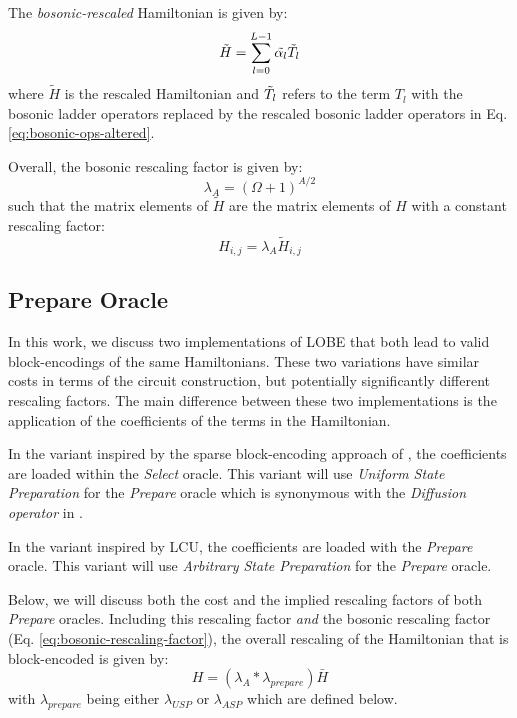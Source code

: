 The \textit{bosonic-rescaled} Hamiltonian is given by:
\begin{equation}
    \tilde{H} = \sum_{l=0}^{L-1} \tilde{\alpha_l} \Tilde{T}_l
\end{equation}
where $\tilde{H}$ is the rescaled Hamiltonian and $\Tilde{T}_l$ refers to the term $T_l$ with the bosonic ladder operators replaced by the rescaled bosonic ladder operators in Eq. \ref{eq:bosonic-ops-altered}.

Overall, the bosonic rescaling factor is given by:
\begin{equation}
    \label{eq:bosonic-rescaling-factor}
    \lambda_A = (\Omega + 1)^{A/2}
\end{equation}
such that the matrix elements of $\tilde{H}$ are the matrix elements of $H$ with a constant rescaling factor:
\begin{equation}
    H_{i,j} = \lambda_A \tilde{H}_{i,j}
\end{equation}

\subsection{Prepare Oracle}
\label{subsec:prepare}

In this work, we discuss two implementations of LOBE that both lead to valid block-encodings of the same Hamiltonians.
These two variations have similar costs in terms of the circuit construction, but potentially significantly different rescaling factors.
The main difference between these two implementations is the application of the coefficients of the terms in the Hamiltonian.

In the variant inspired by the sparse block-encoding approach of \cite{camps2024explicit, liu2024efficient}, the coefficients are loaded within the \textit{Select} oracle.
This variant will use \textit{Uniform State Preparation} for the \textit{Prepare} oracle which is synonymous with the \textit{Diffusion operator} in \cite{camps2024explicit, liu2024efficient}.

In the variant inspired by LCU, the coefficients are loaded with the \textit{Prepare} oracle.
This variant will use \textit{Arbitrary State Preparation} for the \textit{Prepare} oracle.

Below, we will discuss both the cost and the implied rescaling factors of both \textit{Prepare} oracles.
Including this rescaling factor \textit{and} the bosonic rescaling factor (Eq. \ref{eq:bosonic-rescaling-factor}), the overall rescaling of the Hamiltonian that is block-encoded is given by:
\begin{equation}
    \label{eq:post-process}
    H = (\lambda_A * \lambda_{prepare}) \bar{H}
\end{equation}
with $\lambda_{prepare}$ being either $\lambda_{USP}$ or $\lambda_{ASP}$ which are defined below.


